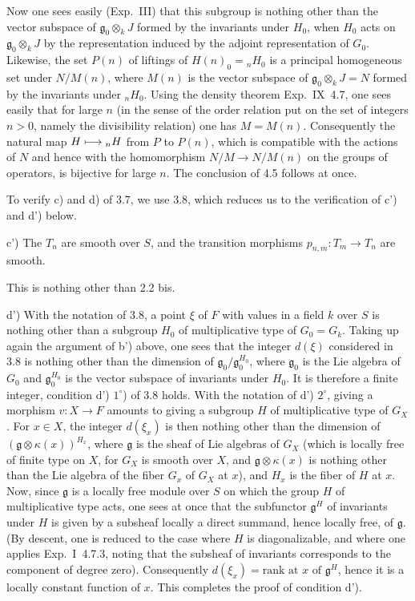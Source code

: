 Now one sees easily (Exp.~III) that this subgroup is nothing other than the vector subspace of $\mathfrak g_0\otimes_k J$ formed by the invariants under $H_0$, when $H_0$ acts on $\mathfrak g_0\otimes_k J$ by the representation induced by the adjoint representation of $G_0$. Likewise, the set $P(n)$ of liftings of $H(n)_0={}_nH_0$ is a principal homogeneous set under $N/M(n)$, where $M(n)$ is the vector subspace of $\mathfrak g_0\otimes_k J=N$ formed by the invariants under ${}_nH_0$. Using the density theorem Exp.~IX~4.7, one sees easily that for large $n$ (in the sense of the order relation put on the set of integers $n>0$, namely the divisibility relation) one has $M=M(n)$. Consequently the natural map $H\longmapsto{}_nH$ from $P$ to $P(n)$, which is compatible with the actions of $N$ and hence with the homomorphism $N/M\to N/M(n)$ on the groups of operators, is bijective for large $n$. The conclusion of 4.5 follows at once.

To verify c) and d) of 3.7, we use 3.8, which reduces us to the verification of c') and d') below.

c') The $T_n$ are smooth over $S$, and the transition morphisms $p_{n,m}:T_m\to T_n$ are smooth.

This is nothing other than 2.2 bis.

d') With the notation of 3.8, a point $\xi$ of $F$ with values in a field $k$ over $S$ is nothing other than a subgroup $H_0$ of multiplicative type of $G_0=G_k$. Taking up again the argument of b') above, one sees that the integer $d(\xi)$ considered in 3.8 is nothing other than the dimension of $\mathfrak g_0/\mathfrak g_0^{H_0}$, where $\mathfrak g_0$ is the Lie algebra of $G_0$ and $\mathfrak g_0^{H_0}$ is the vector subspace of invariants under $H_0$. It is therefore a finite integer, \ie condition d') $1^\circ$) of 3.8 holds. With the notation of d') $2^\circ$, giving a morphism $v:X\to F$ amounts to giving a subgroup $H$ of multiplicative type of $G_X$. For $x\in X$, the integer $d(\xi_x)$ is then nothing other than the dimension of $(\mathfrak g\otimes\kappa(x))^{H_x}$, where $\mathfrak g$ is the sheaf of Lie algebras of $G_X$ (which is locally free of finite type on $X$, for $G_X$ is smooth over $X$, and $\mathfrak g\otimes\kappa(x)$ is nothing other than the Lie algebra of the fiber $G_x$ of $G_X$ at $x$), and $H_x$ is the fiber of $H$ at $x$. Now, since $\mathfrak g$ is a locally free module over $S$ on which the group $H$ of multiplicative type acts, one sees at once that the subfunctor $\mathfrak g^H$ of invariants under $H$ is given by a subsheaf locally a direct summand, hence locally free, of $\mathfrak g$. (By descent, one is reduced to the case where $H$ is diagonalizable, and where one applies Exp.~I~4.7.3, noting that the subsheaf of invariants corresponds to the component of degree zero). Consequently $d(\xi_x)=\text{rank at }x\text{ of }\mathfrak g^H$, hence it is a locally constant function of $x$. This completes the proof of condition d').

